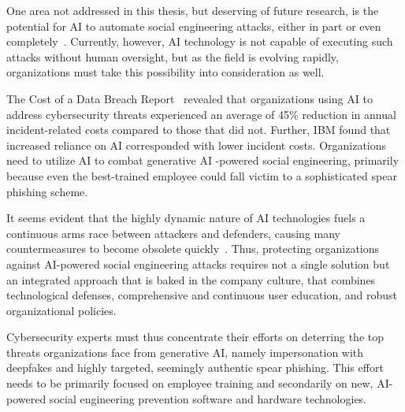 One area not addressed in this thesis, but deserving of future research, is the potential for AI to automate social engineering attacks, either in part or even completely~\citep{mirsky_Threat_Offensive_AI_Organizations_2023}. Currently, however, AI technology is not capable of executing such attacks without human oversight, but as the field is evolving rapidly, organizations must take this possibility into consideration as well.


The Cost of a Data Breach Report~\citep{ibm_Cost_Data_Breach_Report_2024} revealed that organizations using AI to address cybersecurity threats experienced an average of 45\% reduction in annual incident-related costs compared to those that did not. Further, IBM found that increased reliance on AI corresponded with lower incident costs. Organizations need to utilize AI to combat generative AI -powered social engineering, primarily because even the best-trained employee could fall victim to a sophisticated spear phishing scheme.

It seems evident that the highly dynamic nature of AI technologies fuels a continuous arms race between attackers and defenders, causing many countermeasures to become obsolete quickly~\citep{fakhouri_AI_Driven_Solutions_SE_Attacks_2024}. Thus, protecting organizations against AI-powered social engineering attacks requires not a single solution but an integrated approach that is baked in the company culture, that combines technological defenses, comprehensive and continuous user education, and robust organizational policies.

Cybersecurity experts must thus concentrate their efforts on deterring the top threats organizations face from generative AI, namely impersonation with deepfakes and highly targeted, seemingly authentic spear phishing. This effort needs to be primarily focused on employee training and secondarily on new, AI-powered social engineering prevention software and hardware technologies.

%
%
